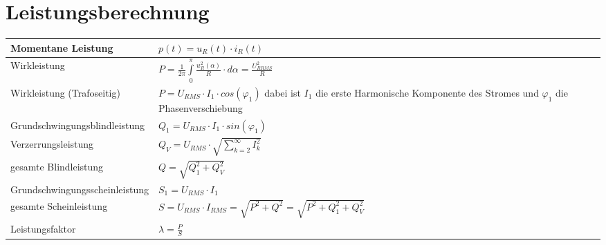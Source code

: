 \section{Leistungsberechnung}
\begin{tabu}{|p{0.3\textwidth}|p{0.6\textwidth}|}
  \hline
  Momentane Leistung
  	& $p(t) = u_{R}(t) \cdot i_{R}(t)$\\
  \hline
  Wirkleistung
  	& $P = \frac{1}{2\pi}\int\limits_{0}^{\pi}\frac{u_{R}^2(\alpha)}{R} \cdot d\alpha = \frac{U_{R RMS}^2}{R}$\\
  \hline
  Wirkleistung (Trafoseitig)
  	& $P = U_{RMS} \cdot I_{1} \cdot cos(\varphi_{1})$ \newline
  		dabei ist $I_{1}$ die erste Harmonische Komponente des Stromes \newline
  		und $\varphi_{1}$ die Phasenverschiebung\\
  \hline
  Grundschwingungsblindleistung
  	& $Q_{1} = U_{RMS} \cdot I_{1} \cdot sin(\varphi_{1})$\\
  \hline
  Verzerrungsleistung
  	& $Q_{V} =  U_{RMS} \cdot \sqrt{\sum\limits_{k = 2}^{\infty}I_{k}^2}$\\
  \hline
  gesamte Blindleistung
  	& $Q = \sqrt{Q_{1}^2 + Q_{V}^2}$\\
  \hline
  Grundschwingungsscheinleistung
  	& $S_{1} = U_{RMS} \cdot I_{1}$\\
  \hline
  gesamte Scheinleistung
  	& $S = U_{RMS} \cdot I_{RMS} = \sqrt{P^2 + Q^2} = \sqrt{P^2 + Q_{1}^2 + Q_{V}^2}$\\
  \hline
  Leistungsfaktor
  	& $\lambda = \frac{P}{S}$\\
  \hline
\end{tabu}